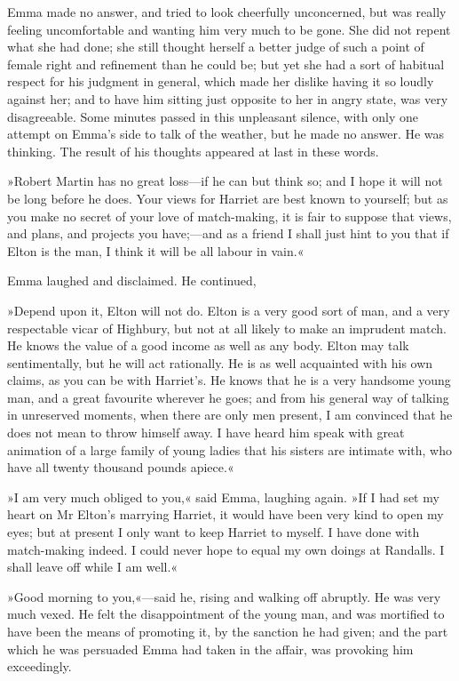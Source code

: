 Emma made no answer, and tried to look cheerfully unconcerned, but was really feeling uncomfortable and wanting him very much to be gone. She did not repent what she had done; she still thought herself a better judge of such a point of female right and refinement than he could be; but yet she had a sort of habitual respect for his judgment in general, which made her dislike having it so loudly against her; and to have him sitting just opposite to her in angry state, was very disagreeable. Some minutes passed in this unpleasant silence, with only one attempt on Emma's side to talk of the weather, but he made no answer. He was thinking. The result of his thoughts appeared at last in these words.

»Robert Martin has no great loss—if he can but think so; and I hope it will not be long before he does. Your views for Harriet are best known to yourself; but as you make no secret of your love of match-making, it is fair to suppose that views, and plans, and projects you have;—and as a friend I shall just hint to you that if Elton is the man, I think it will be all labour in vain.«

Emma laughed and disclaimed. He continued,

»Depend upon it, Elton will not do. Elton is a very good sort of man, and a very respectable vicar of Highbury, but not at all likely to make an imprudent match. He knows the value of a good income as well as any body. Elton may talk sentimentally, but he will act rationally. He is as well acquainted with his own claims, as you can be with Harriet's. He knows that he is a very handsome young man, and a great favourite wherever he goes; and from his general way of talking in unreserved moments, when there are only men present, I am convinced that he does not mean to throw himself away. I have heard him speak with great animation of a large family of young ladies that his sisters are intimate with, who have all twenty thousand pounds apiece.«

»I am very much obliged to you,« said Emma, laughing again. »If I had set my heart on Mr Elton's marrying Harriet, it would have been very kind to open my eyes; but at present I only want to keep Harriet to myself. I have done with match-making indeed. I could never hope to equal my own doings at Randalls. I shall leave off while I am well.«

»Good morning to you,«—said he, rising and walking off abruptly. He was very much vexed. He felt the disappointment of the young man, and was mortified to have been the means of promoting it, by the sanction he had given; and the part which he was persuaded Emma had taken in the affair, was provoking him exceedingly.

